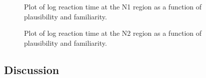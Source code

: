 \documentclass[
  12pt,
  letterpaper,
]{scrreprt}
\begin{document}
\begin{figure}[htbp]

\caption{\label{fig-N1Staub}Plot of log reaction time at the N1 region
as a function of plausibility and familiarity.}


\end{figure}%

\begin{figure}[htbp]

\caption{\label{fig-N2Staub}Plot of log reaction time at the N2 region
as a function of plausibility and familiarity.}


\end{figure}%

\subsection{Discussion}\label{discussion}
\end{document}

